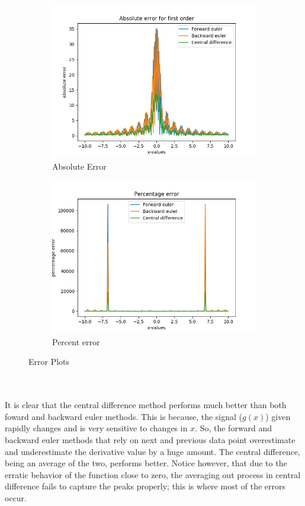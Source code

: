 \documentclass[12pt]{article}
\begin{document}
\begin{figure}[h]
	\centering
	\begin{subfigure}[h]{0.40\textwidth}
		\centering
		\includegraphics[width=\textwidth]{gprimeabserror.png}
		\caption{Absolute Error }
	\end{subfigure}
	\begin{subfigure}[h]{0.40\textwidth}
		\centering
		\includegraphics[width=\textwidth]{gprimepercenterror.png}
		\caption{Percent error}
	\end{subfigure}
	\caption{Error Plots}
\end{figure}\\\\
It is clear that the central difference method performs much better than both foward and backward euler methods.  This is because, the signal ($g(x)$) given rapidly changes and is very sensitive to changes in $x$. So, the forward and backward euler methods that rely on next and previous data point overestimate and underestimate the derivative value by a huge amount. The central difference, being an average of the two, performs better. Notice however, that due to the erratic behavior of the function close to zero, the averaging out process in central difference fails to capture the peaks properly; this is where most of the errors occur.\\\\
\end{document}
